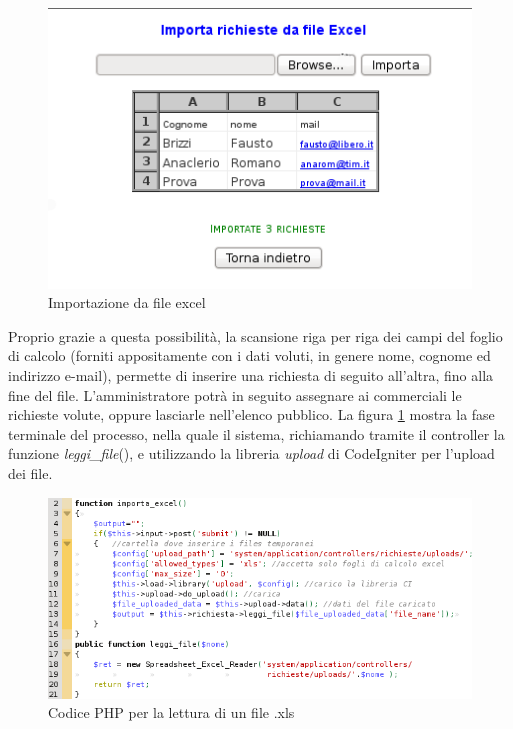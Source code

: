 \begin{figure}[!ht]
\centering
  \includegraphics[scale=0.8]{./images/importaExcelScreen.png}
\caption{Importazione da file excel}
\label{excel}
\end{figure}

\noindent
Proprio grazie a questa possibilit\`a, la scansione riga per riga dei campi del foglio di calcolo (forniti appositamente con i dati voluti, in genere nome, cognome ed indirizzo e-mail), permette di inserire una richiesta di seguito all'altra, fino alla fine del file. L'amministratore potr\`a in seguito assegnare ai commerciali le richieste volute, oppure lasciarle nell'elenco pubblico. 
\newpage
La figura \ref{excel} mostra la fase terminale del processo, nella quale il sistema, richiamando tramite il controller la funzione \textit{leggi\_file}(), e utilizzando la libreria \textit{upload} di CodeIgniter per l'upload dei file.

\begin{figure}[!ht]
\centering
  \includegraphics[scale=0.8]{./images/codiceexcel.png}
\caption{Codice PHP per la lettura di un file .xls}
\label{excelcode}
\end{figure}

